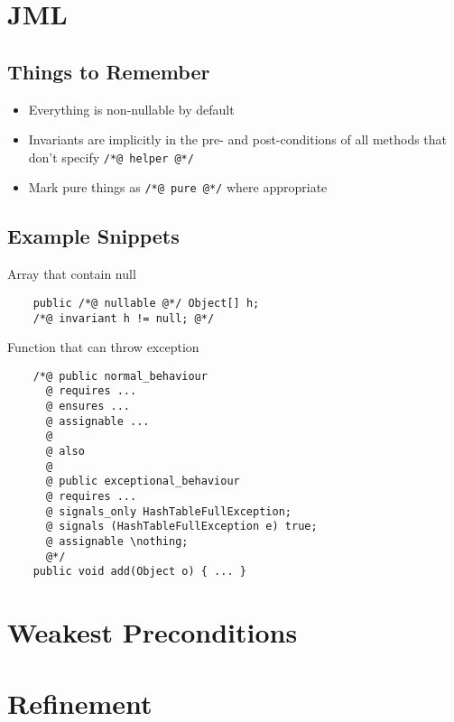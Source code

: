 \documentclass[landscape]{cheat}
\begin{document}
\begin{multicols*}{3}
\section{JML}
\subsection{Things to Remember}
\begin{itemize}
    \item Everything is non-nullable by default
    \item Invariants are implicitly in the pre- and post-conditions of all methods that don't specify \texttt{/*@ helper @*/}
    \item Mark pure things as \texttt{/*@ pure @*/} where appropriate
\end{itemize}

\subsection{Example Snippets}
Array that contain null
\begin{lstlisting}
    public /*@ nullable @*/ Object[] h;
    /*@ invariant h != null; @*/
\end{lstlisting}

Function that can throw exception
\begin{lstlisting}
    /*@ public normal_behaviour
      @ requires ...
      @ ensures ...
      @ assignable ...
      @
      @ also
      @
      @ public exceptional_behaviour
      @ requires ...
      @ signals_only HashTableFullException;
      @ signals (HashTableFullException e) true;
      @ assignable \nothing;
      @*/
    public void add(Object o) { ... }
\end{lstlisting}

\section{Weakest Preconditions}

\section{Refinement}

\end{multicols*}
\end{document}
